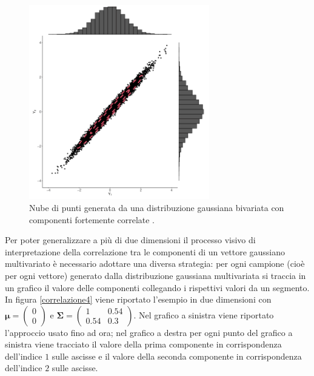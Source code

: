 \begin{figure}[h]
    \centering
    \includegraphics[width=0.7\textwidth]{images/Gaussiane/VettoreBivariatoIndipendenza3.png}
    \caption{Nube di punti generata da una distribuzione gaussiana bivariata con componenti fortemente correlate \cite{wilkinson_introduction_2020}.}
    \label{correlazione3}
\end{figure}

\newpage

Per poter generalizzare a più di due dimensioni il processo visivo di interpretazione della correlazione tra le componenti di un vettore gaussiano multivariato è necessario adottare una diversa strategia: per ogni campione (cioè per ogni vettore) generato dalla distribuzione gaussiana multivariata si traccia in un grafico il valore delle componenti collegando i rispettivi valori da un segmento.\\
In figura \ref{correlazione4} viene riportato l'esempio in due dimensioni con $\bm{\mu} = \begin{pmatrix}0\\0\end{pmatrix}$ e $\mathbf{\Sigma}=\begin{pmatrix}1&0.54\\0.54&0.3\end{pmatrix}$. Nel grafico a sinistra viene riportato l'approccio usato fino ad ora; nel grafico a destra per ogni punto del grafico a sinistra viene tracciato il valore della prima componente in corrispondenza dell'indice $1$ sulle ascisse e il valore della seconda componente in corrispondenza dell'indice $2$ sulle ascisse.


